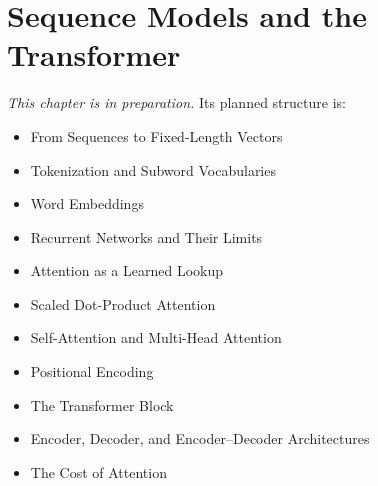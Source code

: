 
\chapter{Sequence Models and the Transformer}
\label{ch:ch18}

\noindent\textit{This chapter is in preparation.} Its planned structure is:

\begin{itemize}
  \item From Sequences to Fixed-Length Vectors
  \item Tokenization and Subword Vocabularies
  \item Word Embeddings
  \item Recurrent Networks and Their Limits
  \item Attention as a Learned Lookup
  \item Scaled Dot-Product Attention
  \item Self-Attention and Multi-Head Attention
  \item Positional Encoding
  \item The Transformer Block
  \item Encoder, Decoder, and Encoder--Decoder Architectures
  \item The Cost of Attention
\end{itemize}
